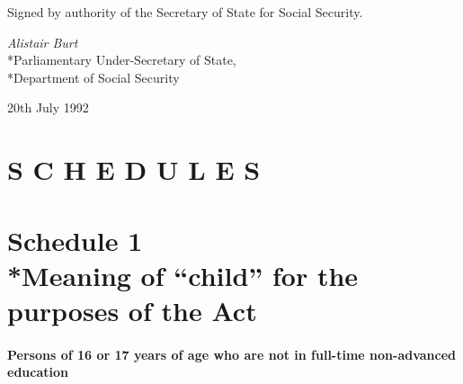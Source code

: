\documentclass[a4paper,12pt]{article}
\begin{document}
%
%
%
%

\bigskip

Signed by authority of the Secretary of State for Social Security.

{\raggedleft
\emph{Alistair Burt}\\*Parliamentary Under-Secretary of State,\\*Department of Social Security

}

20th July 1992

\small

\part*{S C H E D U L E S}

\part[Schedule 1 --- Meaning of ``child'' for the purposes of the Act]{Schedule 1\\*Meaning of ``child'' for the purposes of the Act}

\renewcommand\parthead{--- Schedule 1}

\subsection*{Persons of 16 or 17 years of age who are not in full-time non-advanced education}
\end{document}
